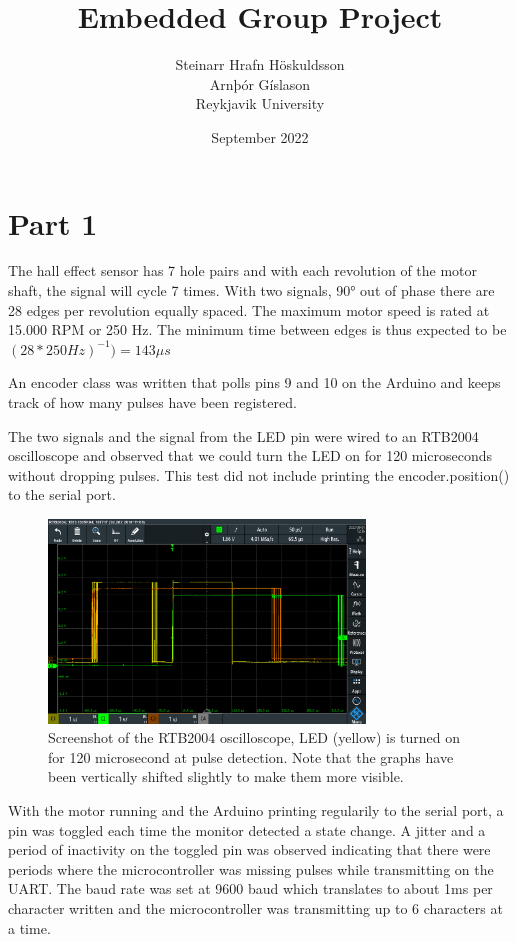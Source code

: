 \documentclass{article}
\title{Embedded Group Project}
\author{Steinarr Hrafn Höskuldsson\\
Arnþór Gíslason\\
Reykjavik University}
\date{September 2022}
\begin{document}
\maketitle

\section*{Part 1}
The hall effect sensor has 7 hole pairs and with each revolution of the motor shaft, the signal will cycle 7 times. With two signals, 90° out of phase there are 28 edges per revolution equally spaced. The maximum motor speed is rated at 15.000 RPM or 250 Hz. The minimum time between edges is thus expected to be \((28*250Hz)^{-1}) = 143 \mu s\)

An encoder class was written that polls pins 9 and 10 on the Arduino and keeps track of how many pulses have been registered. 

The two signals and the signal from the LED pin were wired to an RTB2004 oscilloscope and observed that we could turn the LED on for 120 microseconds without dropping pulses. This test did not include printing the encoder.position() to the serial port. 


\begin{figure}[h]
    \centering
    \includegraphics[width=0.75\textwidth]{Project1RotaryEncoder/oscilloscope_part1_120ms.PNG}
    \caption{Screenshot of the RTB2004 oscilloscope, LED (yellow) is turned on for 120 microsecond at pulse detection. Note that the graphs have been vertically shifted slightly to make them more visible.}
    \label{fig:osc120}
\end{figure}

With the motor running and the Arduino printing regularily to the serial port, a pin was toggled each time the monitor detected a state change. A jitter and a period of inactivity on the toggled pin was observed indicating that there were periods where the microcontroller was missing pulses while transmitting on the UART. The baud rate was set at 9600 baud which translates to about 1ms per character written and the microcontroller was transmitting up to 6 characters at a time. 
\end{document}
